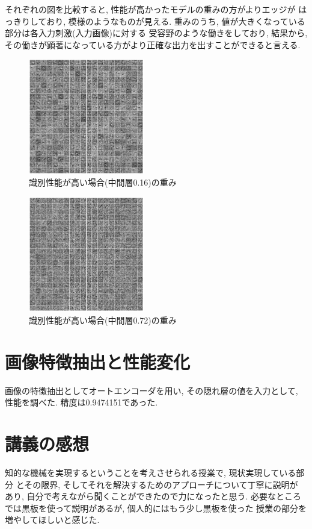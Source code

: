 \documentclass[10pt,a4paper,twocolumn]{jarticle}
\begin{document}
それぞれの図を比較すると, 性能が高かったモデルの重みの方がよりエッジが
はっきりしており, 模様のようなものが見える. 
重みのうち, 値が大きくなっている部分は各入力刺激(入力画像)に対する
受容野のような働きをしており, 結果から, 
その働きが顕著になっている方がより正確な出力を出すことができると言える. 
\begin{figure}[htbp] 
  \centering
  \includegraphics[width=0.45\textwidth]{assets/img/n_hidden_test_mnist_image_nsmpl150000_nh0.16.eps}
  \caption{識別性能が高い場合(中間層0.16)の重み}
  \label{fig:hidden-layer-analyze-img-0.16}
\end{figure}
\begin{figure}[htbp] 
  \centering
  \includegraphics[width=0.45\textwidth]{assets/img/n_hidden_test_mnist_image_nsmpl150000_nh0.72.eps}
  \caption{識別性能が高い場合(中間層0.72)の重み}
  \label{fig:hidden-layer-analyze-img-0.72}
\end{figure}
\section{画像特徴抽出と性能変化}
画像の特徴抽出としてオートエンコーダを用い, その隠れ層の値を入力として, 
性能を調べた. 
精度は0.9474151であった. 
\section{講義の感想}
知的な機械を実現するということを考えさせられる授業で, 現状実現している部分
とその限界, そしてそれを解決するためのアプローチについて丁寧に説明が
あり, 自分で考えながら聞くことができたので力になったと思う. 
必要なところでは黒板を使って説明があるが, 個人的にはもう少し黒板を使った
授業の部分を増やしてほしいと感じた. 
\end{document}
